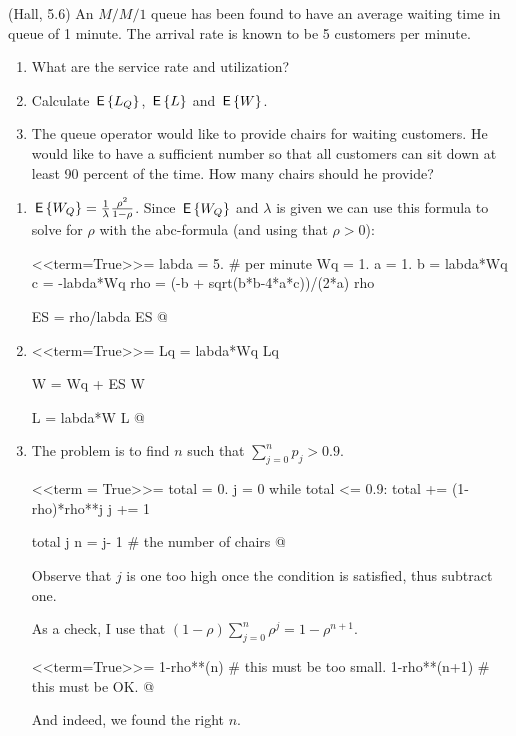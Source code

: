 \begin{question}(Hall, 5.6)
  An $M/M/1$ queue has been found to have an average waiting time in queue of 1 minute. The arrival rate is known to be 5 customers per minute.
  \begin{enumerate}
  \item What are the service rate and utilization?
  \item Calculate $\,\mathsf{E}\left\{L_Q\right\}$,  $\,\mathsf{E}\left\{L\right\}$ and $\,\mathsf{E}\left\{W\right\}$.
  \item The queue operator would like to provide chairs for waiting customers. He would like to have a sufficient number so that all customers can sit down at least 90 percent of the time. How many chairs should he provide?
  \end{enumerate}
  
    \begin{solution}
      \begin{enumerate}
      \item $\,\mathsf{E}\left\{W_Q\right\} = \frac{1}{\lambda}\frac{\rho^2}{1-\rho}$. Since
        $\,\mathsf{E}\left\{W_Q\right\}$ and $\lambda$ is given we can use this formula to
        solve for $\rho$ with the abc-formula (and using that
        $\rho > 0$):

<<term=True>>=
labda = 5. # per minute
Wq = 1.
a = 1.
b = labda*Wq
c = -labda*Wq
rho = (-b + sqrt(b*b-4*a*c))/(2*a)
rho 

ES = rho/labda
ES
@ 

\item 

<<term=True>>=
Lq = labda*Wq
Lq

W = Wq + ES
W

L = labda*W
L
@ 

\item 

The problem is to find $n$ such that
      $\sum_{j=0}^n p_j > 0.9$.

<<term = True>>=
total = 0. 
j = 0
while total <= 0.9:
   total += (1-rho)*rho**j
   j += 1

total
j
n = j- 1 # the number of chairs 
@ 

Observe that $j$ is one too high once the condition is satisfied, thus subtract one.

As a check, I use that $(1-\rho) \sum_{j=0}^n \rho^j = 1-\rho^{n+1}$.

<<term=True>>=
1-rho**(n) #  this must be too small.
1-rho**(n+1) # this must be OK.
@ 

And indeed, we found the right $n$.

  \end{enumerate}

    \end{solution}
\end{question}

